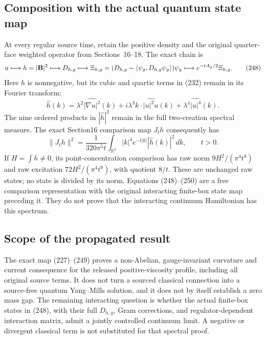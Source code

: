 \subsection{Composition with the actual quantum state map}

At every regular source time, retain the positive density and the original
quarter-face weighted operator from Sections~16--18. The exact chain is
\[
 u\longmapsto h=|{\bf B}|^2
 \longmapsto D_{h,g}
 \longmapsto \Xi_{h,g}=(D_{h,g}-\langle\psi_g,D_{h,g}\psi_g\rangle)\psi_g
 \longmapsto e^{-tA_g/2}\Xi_{h,g}.
\tag{248}
\]
Here \(h\) is nonnegative, but its cubic and quartic terms in (232) remain
in its Fourier transform:
\[
 \widehat h(k)=\lambda^2\widehat{|\nabla u|^2}(k)
 +i\lambda^3 k\cdot\widehat{|u|^2u}(k)
 +\lambda^4\widehat{|u|^4}(k).
\tag{249}
\]
The nine ordered products in \(|\widehat h|^2\) remain in the full
two-creation spectral measure. The exact Section16 comparison map
\(J_t h\) consequently has
\[
 \|J_t h\|^2=\frac1{320\pi^5t}\int_{\mathbb R^3}|k|^4e^{-t|k|}
 |\widehat h(k)|^2\,dk,\qquad t>0.
\tag{250}
\]
If \(H=\int h\ne0\), its point-concentration comparison has raw norm
\(9H^2/(\pi^4t^8)\) and raw excitation \(72H^2/(\pi^4t^9)\), with quotient
\(8/t\). These are unchanged raw states; no state is divided by its norm.
Equations (248)--(250) are a free comparison representation with the
original interacting finite-box state map preceding it. They do not prove
that the interacting continuum Hamiltonian has this spectrum.

\subsection{Scope of the propagated result}

The exact map (227)--(249) proves a non-Abelian, gauge-invariant curvature
and current consequence for the released positive-viscosity profile,
including all original source terms. It does not turn a sourced classical
connection into a source-free quantum Yang--Mills solution, and it does
not by itself establish a zero mass gap. The remaining interacting
question is whether the actual finite-box states in (248), with their
full \(D_{h,g}\), Gram corrections, and regulator-dependent interaction
matrix, admit a jointly controlled continuum limit. A negative or
divergent classical term is not substituted for that spectral proof.
